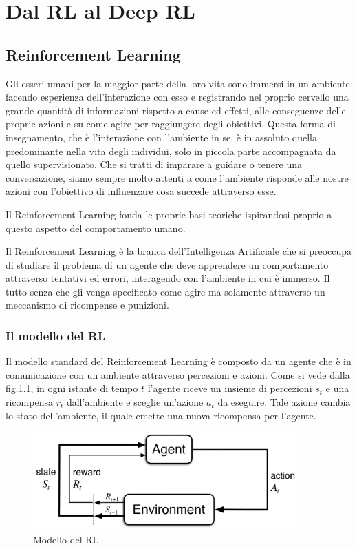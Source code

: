 \chapter{Dal RL al Deep RL}

\section{Reinforcement Learning}
Gli esseri umani per la maggior parte della loro vita sono immersi in un ambiente facendo esperienza dell'interazione con esso e registrando nel proprio cervello una grande quantità di informazioni rispetto a cause ed effetti, alle conseguenze delle proprie azioni e su come agire per raggiungere degli obiettivi.
Questa forma di insegnamento, che è l'interazione con l'ambiente in se, è in assoluto quella predominante nella vita degli individui, solo in piccola parte accompagnata da quello supervisionato.
Che si tratti di imparare a guidare o tenere una conversazione, siamo sempre molto attenti a come l'ambiente risponde alle nostre azioni con l'obiettivo di influenzare cosa succede attraverso esse.\cite{rlBook}\newline

Il Reinforcement Learning fonda le proprie basi teoriche ispirandosi proprio a questo aspetto del comportamento umano.\newline

Il Reinforcement Learning è la branca dell'Intelligenza Artificiale che si preoccupa di studiare il problema di un agente che deve apprendere un comportamento attraverso tentativi ed errori, interagendo con l'ambiente in cui è immerso.
Il tutto senza che gli venga specificato come agire ma solamente attraverso un meccanismo di ricompense e punizioni.\newline
\clearpage

\subsection{Il modello del RL}

Il modello standard del Reinforcement Learning è composto da un agente che è in comunicazione con un ambiente attraverso percezioni e azioni. Come si vede dalla fig.\ref{fig:rl_model}, in ogni istante di tempo $t$ l'agente riceve un insieme di percezioni $s_t$ e una ricompensa $r_t$ dall'ambiente e sceglie un'azione $a_t$ da eseguire. Tale azione cambia lo stato dell'ambiente, il quale emette una nuova ricompensa per l'agente.

\begin{figure}[hb]
    \centering
    \includegraphics[width = 4in]{Figures/Chapter1/RL_model4x.jpg}
    \caption{Modello del RL}
    \label{fig:rl_model}
\end{figure}

